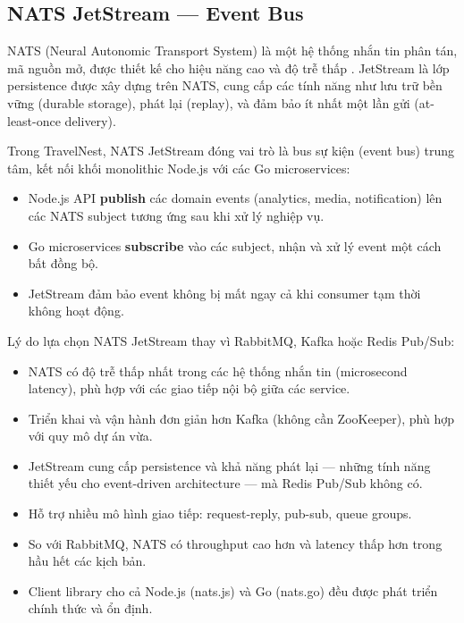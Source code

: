 \documentclass[13pt,a4paper,twoside]{report}
\begin{document}
\subsection{NATS JetStream --- Event Bus}

NATS (Neural Autonomic Transport System) là một hệ thống nhắn tin phân tán, mã nguồn mở, được thiết kế cho hiệu năng cao và độ trễ thấp \cite{nats2024docs}. JetStream là lớp persistence được xây dựng trên NATS, cung cấp các tính năng như lưu trữ bền vững (durable storage), phát lại (replay), và đảm bảo ít nhất một lần gửi (at-least-once delivery).

Trong TravelNest, NATS JetStream đóng vai trò là bus sự kiện (event bus) trung tâm, kết nối khối monolithic Node.js với các Go microservices:

\begin{itemize}
  \item Node.js API \textbf{publish} các domain events (analytics, media, notification) lên các NATS subject tương ứng sau khi xử lý nghiệp vụ.
  \item Go microservices \textbf{subscribe} vào các subject, nhận và xử lý event một cách bất đồng bộ.
  \item JetStream đảm bảo event không bị mất ngay cả khi consumer tạm thời không hoạt động.
\end{itemize}

Lý do lựa chọn NATS JetStream thay vì RabbitMQ, Kafka hoặc Redis Pub/Sub:

\begin{itemize}
  \item NATS có độ trễ thấp nhất trong các hệ thống nhắn tin (microsecond latency), phù hợp với các giao tiếp nội bộ giữa các service.
  \item Triển khai và vận hành đơn giản hơn Kafka (không cần ZooKeeper), phù hợp với quy mô dự án vừa.
  \item JetStream cung cấp persistence và khả năng phát lại --- những tính năng thiết yếu cho event-driven architecture --- mà Redis Pub/Sub không có.
  \item Hỗ trợ nhiều mô hình giao tiếp: request-reply, pub-sub, queue groups.
  \item So với RabbitMQ, NATS có throughput cao hơn và latency thấp hơn trong hầu hết các kịch bản.
  \item Client library cho cả Node.js (nats.js) và Go (nats.go) đều được phát triển chính thức và ổn định.
\end{itemize}
\end{document}
